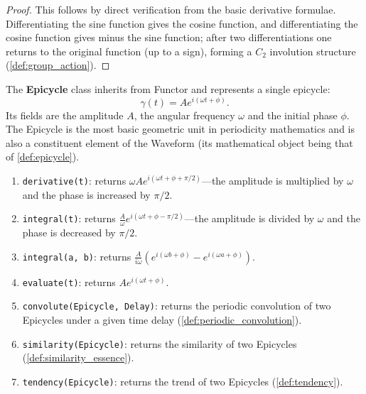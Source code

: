 \begin{proof}
This follows by direct verification from the basic derivative formulae. Differentiating the sine function gives the cosine function, and differentiating the cosine function gives minus the sine function; after two differentiations one returns to the original function (up to a sign), forming a $C_2$ involution structure (\cref{def:group_action}).
\end{proof}

\begin{definition}\label{def:epicycle_class}
The \textbf{Epicycle} class inherits from Functor and represents a single epicycle:
\[
\gamma(t) = A e^{i(\omega t + \phi)}.
\]
Its fields are the amplitude $A$, the angular frequency $\omega$ and the initial phase $\phi$. The Epicycle is the most basic geometric unit in periodicity mathematics and is also a constituent element of the Waveform (its mathematical object being that of \cref{def:epicycle}).
\end{definition}

\begin{property}\label{prop:epicycle_class_methods}
\begin{enumerate}[label=(\roman*)]
    \item \texttt{derivative(t)}: returns $\omega A e^{i(\omega t + \phi + \pi/2)}$---the amplitude is multiplied by $\omega$ and the phase is increased by $\pi/2$.
    \item \texttt{integral(t)}: returns $\frac{A}{\omega} e^{i(\omega t + \phi - \pi/2)}$---the amplitude is divided by $\omega$ and the phase is decreased by $\pi/2$.
    \item \texttt{integral(a, b)}: returns $\frac{A}{i\omega}(e^{i(\omega b + \phi)} - e^{i(\omega a + \phi)})$.
    \item \texttt{evaluate(t)}: returns $A e^{i(\omega t + \phi)}$.
    \item \texttt{convolute(Epicycle, Delay)}: returns the periodic convolution of two Epicycles under a given time delay (\cref{def:periodic_convolution}).
    \item \texttt{similarity(Epicycle)}: returns the similarity of two Epicycles (\cref{def:similarity_essence}).
    \item \texttt{tendency(Epicycle)}: returns the trend of two Epicycles (\cref{def:tendency}).
\end{enumerate}
\end{property}

